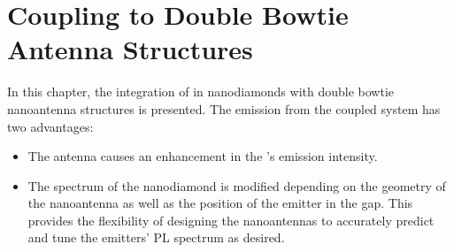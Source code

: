 

\section[Antennas]{Coupling \Nds to Double Bowtie Antenna Structures} \label{sec::coupling_antennas}

	In this chapter, the integration of \sivs in nanodiamonds with double bowtie nanoantenna structures is presented.
	The emission from the coupled system has two advantages:
	\begin{itemize}
		\item The antenna causes an enhancement in the \siv{}'s \pl emission intensity.
		\item The \pl spectrum of the nanodiamond is modified depending on the geometry of the nanoantenna as well as the position of the emitter in the gap. This provides the flexibility of designing the nanoantennas to accurately predict and tune the emitters' PL spectrum as desired.
	\end{itemize}


